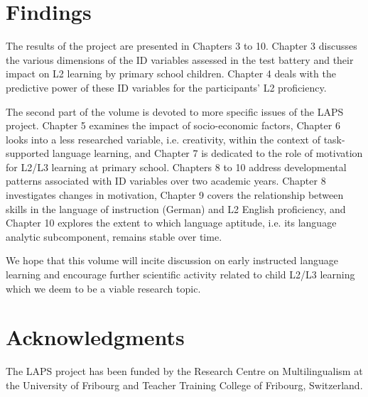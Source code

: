 \documentclass[output=paper]{langsci/langscibook}
\begin{document}
\section{Findings}\label{sec:intro:5}

The results of the project are presented in Chapters 3 to 10. Chapter 3 discusses the various dimensions of the ID variables assessed in the test battery and their impact on L2 learning by primary school children. Chapter 4 deals with the predictive power of these ID variables for the participants’ L2 proficiency.

The second part of the volume is devoted to more specific issues of the LAPS project. Chapter 5 examines the impact of socio-economic factors, Chapter 6 looks into a less researched variable, i.e. creativity, within the context of task-supported language learning, and Chapter 7 is dedicated to the role of motivation for L2/L3 learning at primary school. Chapters 8 to 10 address developmental patterns associated with ID variables over two academic years. Chapter 8 investigates changes in motivation, Chapter 9 covers the relationship between skills in the language of instruction (German) and L2 English proficiency, and Chapter 10 explores the extent to which language aptitude, i.e. its language analytic subcomponent, remains stable over time.

We hope that this volume will incite discussion on early instructed language learning and encourage further scientific activity related to child L2/L3 learning which we deem to be a viable research topic.

\section*{Acknowledgments}

The LAPS project has been funded by the Research Centre on Multilingualism at the University of Fribourg and Teacher Training College of Fribourg, Switzerland. 
\end{document}
